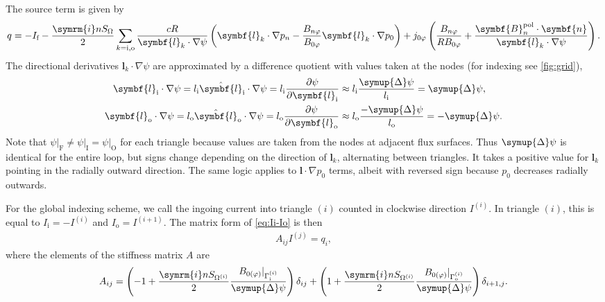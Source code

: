 \documentclass[a4paper, 10pt, english]{article}
\let\temp\vartheta
\let\vartheta\theta
\let\theta\temp
\let\temp\varphi
\let\varphi\phi
\let\phi\temp
\let\vec\symbf
\newcommand*\im{\ensuremath{\symrm{i}}}  %
\newcommand*\pd[2][]{\ensuremath{\frac{\partial #1}{\partial #2}}}  %
\newcommand*\pol{\ensuremath{\textrm{pol}}}  %
\newcommand*\fs{\ensuremath{\textrm{f}}}  %
\newcommand*\inw{\ensuremath{\textrm{i}}}  %
\newcommand*\out{\ensuremath{\textrm{o}}}  %
\newcommand*\vfs{\ensuremath{\textrm{F}}}  %
\newcommand*\vinw{\ensuremath{\textrm{I}}}  %
\newcommand*\vout{\ensuremath{\textrm{O}}}  %
\begin{document}
The source term is given by
\begin{gather}
  q = -I_{\fs} - \frac{\im n S_{\Omega}}{2} \sum_{k = \inw, \out} \frac{c R}{\vec{l}_{k} \cdot \nabla \psi} \left( \vec{l}_{k} \cdot \nabla p_{n} - \frac{B_{n \phi}}{B_{0 \phi}} \vec{l}_{k} \cdot \nabla p_{0} \right) + j_{0 \phi} \left( \frac{B_{n \phi}}{R B_{0 \phi}} + \frac{\vec{B}_{n}^{\pol} \cdot \vec{n}}{\vec{l}_{k} \cdot \nabla \psi} \right).
\end{gather}
The directional derivatives $\vec{l}_{k} \cdot \nabla \psi$ are approximated by a difference quotient with values taken at the nodes (for indexing see \cref{fig:grid}),
\begin{align}
  \vec{l}_{\inw} \cdot \nabla \psi = l_{\inw} \hat{\vec{l}}_{\inw} \cdot \nabla \psi = l_{\inw} \pd[\psi]{\vec{l}_{\inw}} & \approx l_{\inw} \frac{\symup{\Delta} \psi}{l_{\inw}} = \symup{\Delta} \psi, \\
  \vec{l}_{\out} \cdot \nabla \psi = l_{\out} \hat{\vec{l}}_{\out} \cdot \nabla \psi = l_{\out} \pd[\psi]{\vec{l}_{\out}} & \approx l_{\out} \frac{-\symup{\Delta} \psi}{l_{\out}} = -\symup{\Delta} \psi.
\end{align}
Note that $\psi \vert_{\vfs} \neq \psi \vert_{\vinw} = \psi \vert_{\vout}$ for each triangle because values are taken from the nodes at adjacent flux surfaces. Thus $\symup{\Delta} \psi$ is identical for the entire loop, but signs change depending on the direction of $\vec{l}_{k}$, alternating between triangles. It takes a positive value for $\vec{l}_{k}$ pointing in the radially outward direction. The same logic applies to $\vec{l} \cdot \nabla p_{0}$ terms, albeit with reversed sign because $p_{0}$ decreases radially outwards.

For the global indexing scheme, we call the ingoing current into triangle $(i)$ counted in clockwise direction $I^{(i)}$. In triangle $(i)$, this is equal to $I_{\inw} = -I^{(i)}$ and $I_{\out} = I^{(i+1)}$. The matrix form of \cref{eq:Ii-Io} is then
\begin{gather}
  A_{ij} I^{(j)} = q_{i},
\end{gather}
where the elements of the stiffness matrix $A$ are
\begin{gather}
  A_{ij} = \left( -1 + \frac{\im n S_{\Omega^{(i)}}}{2} \frac{B_{0 (\phi)} \vert_{\Gamma_{\inw}^{(i)}}}{\symup{\Delta} \psi} \right) \delta_{i j} + \left( 1 + \frac{\im n S_{\Omega^{(i)}}}{2} \frac{B_{0 (\phi)} \vert_{\Gamma_{\out}^{(i)}}}{\symup{\Delta} \psi} \right) \delta_{i+1, j}.
\end{gather}
\end{document}
